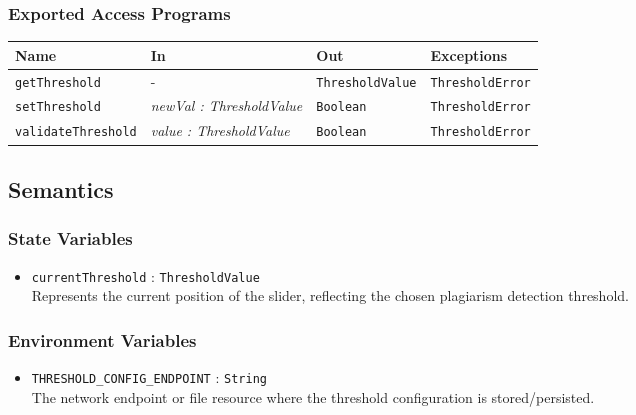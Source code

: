 \documentclass[12pt, titlepage]{article}
\begin{document}
\subsubsection{Exported Access Programs}

\begin{center}
\begin{tabular}{p{3.5cm} p{3.8cm} p{3cm} p{2.5cm}}
\hline
\textbf{Name} & \textbf{In} & \textbf{Out} & \textbf{Exceptions} \\
\hline
\texttt{getThreshold} 
  & - 
  & \texttt{ThresholdValue} 
  & \texttt{ThresholdError} \\

\texttt{setThreshold} 
  & \textit{newVal : ThresholdValue}
  & \texttt{Boolean}
  & \texttt{ThresholdError} \\

\texttt{validateThreshold} 
  & \textit{value : ThresholdValue}
  & \texttt{Boolean} 
  & \texttt{ThresholdError} \\
\hline
\end{tabular}
\end{center}

\subsection{Semantics}

\subsubsection{State Variables}

\begin{itemize}
    \item \texttt{currentThreshold} : \texttt{ThresholdValue} \\
    Represents the current position of the slider, reflecting the chosen plagiarism detection threshold.
\end{itemize}

\subsubsection{Environment Variables}

\begin{itemize}
    \item \texttt{THRESHOLD\_CONFIG\_ENDPOINT} : \texttt{String} \\
    The network endpoint or file resource where the threshold configuration is stored/persisted.
\end{itemize}
\end{document}
